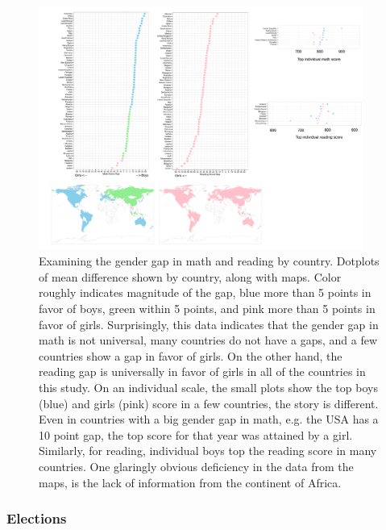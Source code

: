 \documentclass[11pt]{article}
\begin{document}
\begin{figure}[tp]
\centerline{\includegraphics[width=0.95\textwidth]{images/PISA.pdf}}
\caption{Examining the gender gap in math and reading by country. Dotplots of mean difference shown by country, along with maps. Color roughly indicates magnitude of the gap, blue more than 5 points in favor of boys, green within 5 points, and pink more than 5 points in favor of girls. Surprisingly, this data indicates that the gender gap in math is not universal, many countries do not have a gaps, and a few countries show a gap in favor of girls. On the other hand, the reading gap is universally in favor of girls in all of the countries in this study. On an individual scale, the small plots show the top boys (blue) and girls (pink) score in a few countries, the story is different. Even in countries with a big gender gap in math, e.g. the USA has a 10 point gap, the top score for that year was attained by a girl. Similarly, for reading, individual boys top the reading score in many countries. One glaringly obvious deficiency in the data from the maps, is the lack of information from the continent of Africa.}
\label{OECD-gender}
\end{figure}


\subsubsection{Elections}
\end{document}
